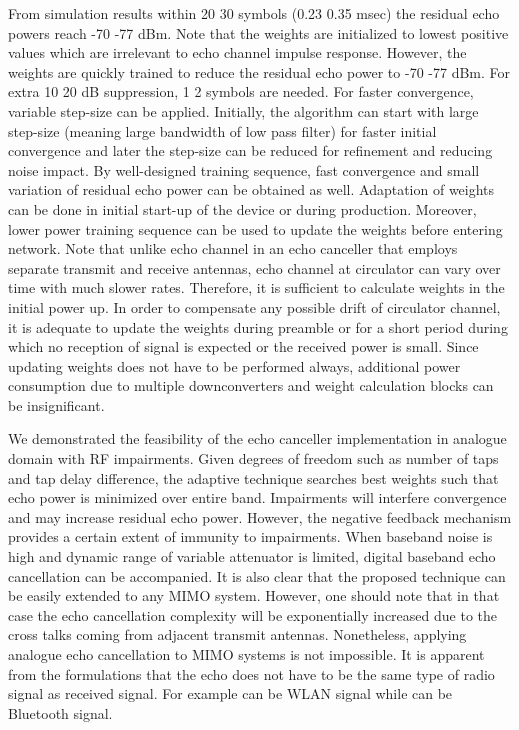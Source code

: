 \documentclass[twocolumn]{IEEEtran}
\begin{document}
From simulation results within 20  30 symbols (0.23 
0.35 msec) the residual echo powers reach -70  -77 dBm. Note
that the weights are initialized to lowest positive values which are
irrelevant to echo channel impulse response. However, the weights
are quickly trained to reduce the residual echo power to -70 
-77 dBm. For extra 10  20 dB suppression, 1  2  symbols are needed. For faster convergence, variable step-size
can be applied. Initially, the algorithm can start with large
step-size (meaning large bandwidth of low pass filter) for faster
initial convergence and later the step-size can be reduced for
refinement and reducing noise impact. By well-designed training
sequence, fast convergence and small variation of residual echo
power can be obtained as well. Adaptation of weights can be done in
initial start-up of the device or during production. Moreover, lower
power training sequence can be used to update the weights before
entering network. Note that unlike echo channel in an echo canceller
that employs separate transmit and receive antennas, echo channel at
circulator can vary over time with much slower rates. Therefore, it
is sufficient to calculate weights in the initial power up. In order
to compensate any possible drift of circulator channel, it is
adequate to update the weights during preamble or for a short period
during which no reception of signal is expected or the received
power is small. Since updating weights does not have to be performed
always, additional power consumption due to multiple downconverters
and weight calculation blocks can be insignificant.

We demonstrated the feasibility of the echo canceller implementation
in analogue domain with RF impairments. Given degrees of freedom
such as number of taps and tap delay difference, the adaptive
technique searches best weights such that echo power is minimized
over entire band. Impairments will interfere convergence and may
increase residual echo power. However, the negative feedback
mechanism provides a certain extent of immunity to impairments. When
baseband noise is high and dynamic range of variable attenuator is
limited, digital baseband echo cancellation can be accompanied. It
is also clear that the proposed technique can be easily extended to
any MIMO system. However, one should note that in that case the echo
cancellation complexity will be exponentially increased due to the
cross talks coming from adjacent transmit antennas. Nonetheless,
applying analogue echo cancellation to MIMO systems is not
impossible. It is apparent from the formulations that the echo does
not have to be the same type of radio signal as received signal. For
example  can be WLAN signal while  can be Bluetooth
signal.
\end{document}
